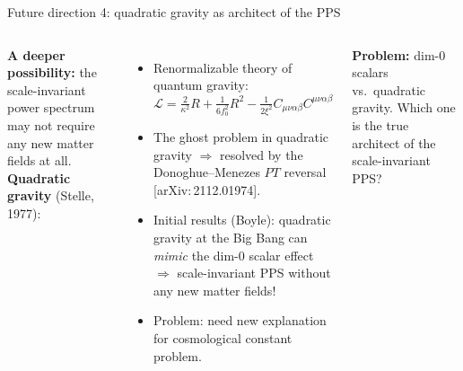 \documentclass[aspectratio=169]{beamer}
\newcommand{\arxiv}[1]{[arXiv:\,#1]}
\begin{document}
\begin{frame}{Future direction 4: quadratic gravity as architect of the PPS}
  \begin{columns}[T]
    \column{\textwidth}
      \textbf{A deeper possibility:} the scale-invariant power
      spectrum may not require any new matter fields at all.\\[0.4em]
      \textbf{Quadratic gravity} (Stelle, 1977):
      \begin{itemize}
        \item Renormalizable theory of quantum gravity:\\
              $\mathcal{L} = \frac{2}{\kappa^2} R+ \frac{1}{6f_0^2} R^2 - \frac{1}{2\xi^2} C_{\mu\nu\alpha\beta}C^{\mu\nu\alpha\beta} $
        \item The ghost problem in quadratic gravity
              $\Rightarrow$ resolved by the Donoghue--Menezes
              $PT$ reversal \arxiv{2112.01974}.
        \item Initial results (Boyle): quadratic gravity at the
              Big Bang can \emph{mimic} the dim-0 scalar effect $\Rightarrow$ scale-invariant PPS without any new matter fields!
        \item Problem: need new explanation for cosmological constant problem.
      \end{itemize}
      \vspace{-1.5em}
      \begin{block}{}
        \small
        \textbf{Problem:} dim-0 scalars vs.\ quadratic gravity. Which one is the true architect of the scale-invariant PPS?
      \end{block}
  \end{columns}
\end{frame}
\end{document}
